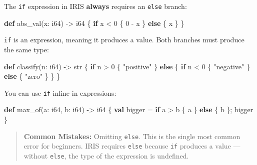 \documentclass[
  english,
]{book}
\newenvironment{Shaded}{\begin{snugshade}}{\end{snugshade}}
\newcommand{\ControlFlowTok}[1]{\textcolor[rgb]{0.77,0.53,0.75}{\textbf{#1}}}
\newcommand{\DataTypeTok}[1]{\textcolor[rgb]{0.31,0.79,0.69}{#1}}
\newcommand{\DecValTok}[1]{\textcolor[rgb]{0.71,0.81,0.66}{#1}}
\newcommand{\KeywordTok}[1]{\textcolor[rgb]{0.34,0.61,0.84}{\textbf{#1}}}
\newcommand{\NormalTok}[1]{\textcolor[rgb]{0.83,0.83,0.83}{#1}}
\newcommand{\OperatorTok}[1]{\textcolor[rgb]{0.83,0.83,0.83}{#1}}
\newcommand{\StringTok}[1]{\textcolor[rgb]{0.81,0.57,0.47}{#1}}
\begin{document}
The \texttt{if} expression in IRIS \textbf{always} requires an
\texttt{else} branch:

\begin{Shaded}
\begin{Highlighting}[]
\KeywordTok{def}\NormalTok{ abs\_val(x: }\DataTypeTok{i64}\NormalTok{) }\OperatorTok{{-}\textgreater{}} \DataTypeTok{i64}\NormalTok{ \{}
    \ControlFlowTok{if}\NormalTok{ x }\OperatorTok{\textless{}} \DecValTok{0}\NormalTok{ \{ }\DecValTok{0} \OperatorTok{{-}}\NormalTok{ x \} }\ControlFlowTok{else}\NormalTok{ \{ x \}}
\NormalTok{\}}
\end{Highlighting}
\end{Shaded}

\texttt{if} is an expression, meaning it produces a value. Both branches
must produce the same type:

\begin{Shaded}
\begin{Highlighting}[]
\KeywordTok{def}\NormalTok{ classify(n: }\DataTypeTok{i64}\NormalTok{) }\OperatorTok{{-}\textgreater{}} \DataTypeTok{str}\NormalTok{ \{}
    \ControlFlowTok{if}\NormalTok{ n }\OperatorTok{\textgreater{}} \DecValTok{0}\NormalTok{ \{}
        \StringTok{"positive"}
\NormalTok{    \} }\ControlFlowTok{else}\NormalTok{ \{}
        \ControlFlowTok{if}\NormalTok{ n }\OperatorTok{\textless{}} \DecValTok{0}\NormalTok{ \{}
            \StringTok{"negative"}
\NormalTok{        \} }\ControlFlowTok{else}\NormalTok{ \{}
            \StringTok{"zero"}
\NormalTok{        \}}
\NormalTok{    \}}
\NormalTok{\}}
\end{Highlighting}
\end{Shaded}

You can use \texttt{if} inline in expressions:

\begin{Shaded}
\begin{Highlighting}[]
\KeywordTok{def}\NormalTok{ max\_of(a: }\DataTypeTok{i64}\NormalTok{, b: }\DataTypeTok{i64}\NormalTok{) }\OperatorTok{{-}\textgreater{}} \DataTypeTok{i64}\NormalTok{ \{}
    \KeywordTok{val}\NormalTok{ bigger }\OperatorTok{=} \ControlFlowTok{if}\NormalTok{ a }\OperatorTok{\textgreater{}}\NormalTok{ b \{ a \} }\ControlFlowTok{else}\NormalTok{ \{ b \};}
\NormalTok{    bigger}
\NormalTok{\}}
\end{Highlighting}
\end{Shaded}

\begin{quote}
\textbf{Common Mistakes:} Omitting \texttt{else}. This is the single
most common error for beginners. IRIS requires \texttt{else} because
\texttt{if} produces a value --- without \texttt{else}, the type of the
expression is undefined.
\end{quote}
\end{document}
